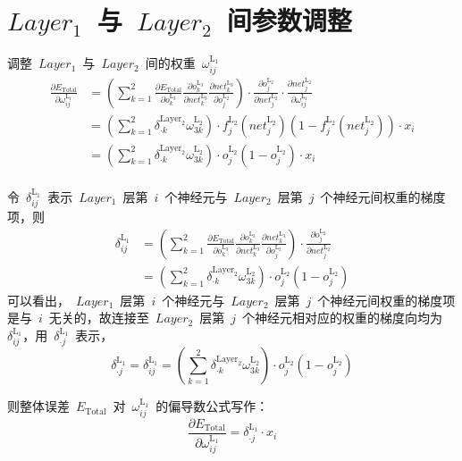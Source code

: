 \documentclass[a4paper, UTF8, heading = true, scheme = chinese, linespread = 1.66, titlepage]{ctexart}
\begin{document}
\section{$Layer_1$~与~$Layer_2$~间参数调整}
调整~$Layer_1$~与~$Layer_2$~间的权重~$\omega^{\text{L}_1}_{ij}$
\begin{align}
\frac{\partial E_{\text{Total}}}{\partial \omega^{\text{L}_1}_{ij}}
&= (\sum_{k=1}^{2}{\frac{\partial E_{\text{Total}}}{\partial o^{\text{L}_3}_{k}} \frac{\partial o^{\text{L}_3}_{k}}{\partial net^{\text{L}_3}_k} \frac{\partial net^{\text{L}_3}_k}{\partial o^{\text{L}_2}_{j}}})  \cdot \frac{\partial o^{\text{L}_2}_{j}}{\partial net^{\text{L}_2}_j} \cdot \frac{\partial net^{\text{L}_2}_j}{\partial \omega^{\text{L}_1}_{ij}} \\
&= (\sum_{k=1}^{2}{\delta^{\text{Layer}_2}_{\cdot k} \omega^{\text{L}_2}_{3k}}) \cdot f^{\text{L}_2}_{j}{(net^{\text{L}_2}_j)}(1 - f^{\text{L}_2}_{j}{(net^{\text{L}_2}_j)}) \cdot x_i \\
&= (\sum_{k=1}^{2}{\delta^{\text{Layer}_2}_{\cdot k} \omega^{\text{L}_2}_{3k}}) \cdot o^{\text{L}_2}_{j}(1 - o^{\text{L}_2}_{j}) \cdot x_i \\
\end{align}

令~$\delta^{\text{L}_1}_{ij}$~表示~$Layer_1$~层第~$i$~个神经元与~$Layer_2$~层第~$j$~个神经元间权重的梯度项，则
\begin{align}
\delta^{\text{L}_1}_{ij} &= (\sum_{k=1}^{2}{\frac{\partial E_{\text{Total}}}{\partial o^{\text{L}_3}_{k}} \frac{\partial o^{\text{L}_3}_{k}}{\partial net^{\text{L}_3}_k} \frac{\partial net^{\text{L}_3}_k}{\partial o^{\text{L}_2}_{j}}})  \cdot \frac{\partial o^{\text{L}_2}_{j}}{\partial net^{\text{L}_2}_j} \\
&= (\sum_{k=1}^{2}{\delta^{\text{Layer}_2}_{\cdot k} \omega^{\text{L}_2}_{3k}}) \cdot o^{\text{L}_2}_{j}(1 - o^{\text{L}_2}_{j})
\end{align}
可以看出，~$Layer_1$~层第~$i$~个神经元与~$Layer_2$~层第~$j$~个神经元间权重的梯度项是与~$i$~无关的，故连接至~$Layer_2$~层第~$j$~个神经元相对应的权重的梯度向均为~$\delta^{\text{L}_1}_{ij}$，用~$\delta^{\text{L}_1}_{\cdot j}$~表示，
\begin{equation}
\delta^{\text{L}_1}_{\cdot j} = \delta^{\text{L}_1}_{ij} = (\sum_{k=1}^{2}{\delta^{\text{Layer}_2}_{\cdot k} \omega^{\text{L}_2}_{3k}}) \cdot o^{\text{L}_2}_{j}(1 - o^{\text{L}_2}_{j})
\end{equation}

则整体误差~$E_{\text{Total}}$~对~$\omega^{\text{L}_1}_{ij}$~的偏导数公式写作：
\begin{equation}
\frac{\partial E_{\text{Total}}}{\partial \omega^{\text{L}_1}_{ij}}
= \delta^{\text{L}_1}_{\cdot j} \cdot x_i
\end{equation}
\end{document}
